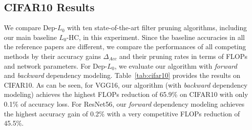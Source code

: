 \documentclass[runningheads, envcountsame, a4paper]{llncs}
\begin{document}


\subsection{CIFAR10 Results}
We compare Dep-$L_0$ with ten state-of-the-art filter pruning algorithms, including our main baseline $L_0$-HC, in this experiment. Since the baseline accuracies in all the reference papers are different, we compare the performances of all competing methods by their accuracy gains $\Delta_{Acc}$ and their pruning rates in terms of FLOPs and network parameters. For Dep-$L_0$, we evaluate our algorithm with \textit{forward} and \textit{backward} dependency modeling. Table~\ref{tab:cifar10} provides the results on CIFAR10. As can be seen, for VGG16, our algorithm (with \textit{backward} dependency modeling) achieves the highest FLOPs reduction of 65.9\% on CIFAR10 with only 0.1\% of accuracy loss. For ResNet56, our \textit{forward} dependency modeling achieves the highest accuracy gain of 0.2\% with a very competitive FLOPs reduction of 45.5\%. %
\end{document}
